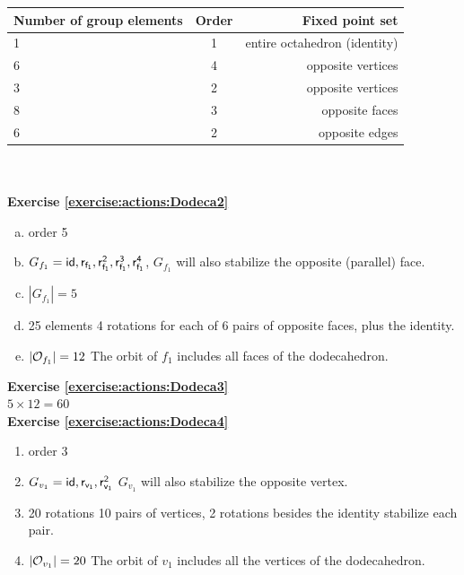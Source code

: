 \begin{tabular}{| l | c | r |} \hline
\textbf{ Number of group elements} & \textbf{Order} & \textbf{Fixed point set} \\ \hline
1 & 1 & entire octahedron (identity) \\ \hline
6 & 4  & opposite vertices\\ \hline
3 & 2 & opposite vertices\\ \hline
8 & 3 & opposite faces  \\ \hline
6 & 2 & opposite edges \\ \hline
\end{tabular}
\\
\\

\noindent\textbf{Exercise \ref{exercise:actions:Dodeca2}}
\begin{enumerate}[(a)]
\item 
order 5

\item
$G_{f_1}={\sf{id},r_{f_1},r_{f_1}^2, r_{f_1}^3, r_{f_1}^4}$, $G_{f_1}$ will also stabilize the opposite (parallel) face.

\item 
$|G_{f_1}|=5$

\item 
25 elements 4 rotations for each of 6 pairs of opposite faces, plus the identity.

\item
$|{\cal O}_{f_1}|=12$ The orbit of $f_1$ includes all faces of the dodecahedron.
\end{enumerate}

\noindent\textbf{Exercise \ref{exercise:actions:Dodeca3}}
\\
$5\times 12=60$
\\

\noindent\textbf{Exercise \ref{exercise:actions:Dodeca4}}
\begin{enumerate} 
\item
order 3

\item 
$G_{v_1}={\sf{id},r_{v_1},r_{v_1}^2}$ $G_{v_1}$ will also stabilize the opposite vertex.

\item
20 rotations 10 pairs of vertices, 2 rotations besides the identity stabilize each pair.

\item
$|{\cal O}_{v_1}|=20$ The orbit of $v_1$ includes all the vertices of the dodecahedron.
\end{enumerate}


